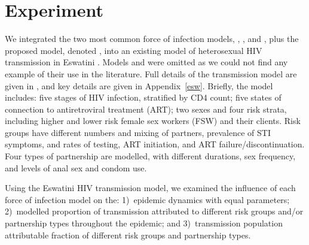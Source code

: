 \section{Experiment}\label{exp}
We integrated the two most common force of infection models, , , and ,
plus the proposed model, denoted ,
into an existing model of heterosexual HIV transmission in Eswatini \cite{TBD}.
 Models  and  were omitted
 as we could not find any example of their use in the literature.
Full details of the transmission model are given in \cite{TBD},
and key details are given in Appendix~\ref{esw}.
Briefly, the model includes:
five stages of HIV infection, stratified by CD4 count;
five states of connection to antiretroviral treatment (ART);
two sexes and four risk strata, including
higher and lower risk female sex workers (FSW) and their clients.
Risk groups have different numbers and mixing of partners, prevalence of STI symptoms,
and rates of testing, ART initiation, and ART failure/discontinuation.
Four types of partnership are modelled, with different
durations, sex frequency, and levels of anal sex and condom use.
\par
Using the Eswatini HIV transmission model, 
we examined the influence of each force of infection model on the:
1)~epidemic dynamics with equal parameters;
2)~modelled proportion of transmission attributed to
different risk groups and/or partnership types throughout the epidemic; and
3)~transmission population attributable fraction \cite{Mishra2014}
of different risk groups and partnership types.
